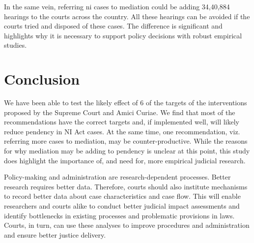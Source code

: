 \documentclass[11pt,a4paper]{article}
\begin{document}
In the same vein, referring \gls{ni} cases to mediation could be adding 34,40,884 hearings to the courts across the country. All these hearings can be avoided if the courts tried and disposed of these cases. The difference is significant and highlights why it is necessary to support policy decisions with robust empirical studies.

\section{Conclusion}

We have been able to test the likely effect of 6 of the targets of the interventions proposed by the Supreme Court and Amici Curiae. We find that most of the recommendations have the correct targets and, if implemented well, will likely reduce pendency in NI Act cases. At the same time, one recommendation, viz. referring more cases to mediation, may be counter-productive. While the reasons for why mediation may be adding to pendency is unclear at this point, this study does highlight the importance of, and need for, more empirical judicial research.

Policy-making and administration are research-dependent processes. Better research requires better data. Therefore, courts should also institute mechanisms to record better data about case characteristics and case flow. This will enable researchers and courts alike to conduct better judicial impact assessments and identify bottlenecks in existing processes and problematic provisions in laws. Courts, in turn, can use these analyses to improve procedures and administration and ensure better justice delivery.
\end{document}
